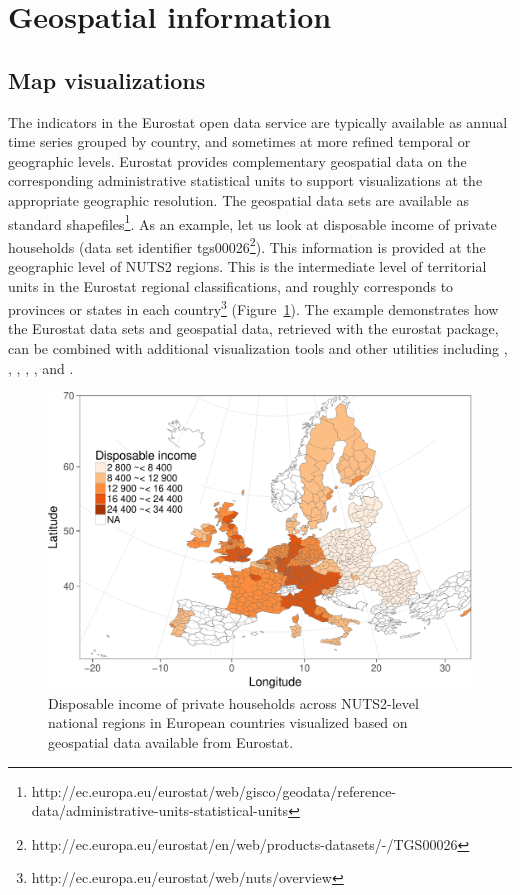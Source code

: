 \section{Geospatial information}

\subsection{Map visualizations}

The indicators in the Eurostat open data service are typically
available as annual time series grouped by country, and sometimes at
more refined temporal or geographic levels. Eurostat provides
complementary geospatial data on the corresponding administrative
statistical units to support visualizations at the appropriate
geographic resolution. The geospatial data sets are available as
standard
shapefiles\footnote{http://ec.europa.eu/eurostat/web/gisco/geodata/reference-data/administrative-units-statistical-units}. As
an example, let us look at disposable income of private households
(data set identifier
tgs00026\footnote{http://ec.europa.eu/eurostat/en/web/products-datasets/-/TGS00026}). This
information is provided at the geographic level of NUTS2 regions. This
is the intermediate level of territorial units in the Eurostat
regional classifications, and roughly corresponds to provinces or
states in each
country\footnote{http://ec.europa.eu/eurostat/web/nuts/overview}
(Figure~\ref{fig:mapexample}). The
example demonstrates how the Eurostat data sets and geospatial data,
retrieved with the eurostat package, can be combined with additional
visualization tools and other utilities including
 \citep{grid},  \citep{maptools},  \citep{rgdal},
 \citep{rgeos},  \citep{scales}, and
 \citep{stringr}.

\begin{figure}
\begin{center}
\includegraphics{2015-manu-mapexample-1}
\caption{Disposable income of private households across NUTS2-level national regions in European countries visualized based on geospatial data available from Eurostat.}
\label{fig:mapexample}
\end{center}
\end{figure}



